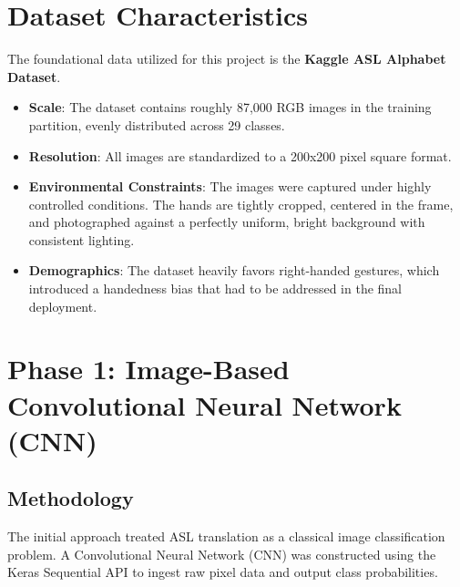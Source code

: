 \documentclass[12pt,a4paper]{article}
\begin{document}
\section{Dataset Characteristics}
The foundational data utilized for this project is the \textbf{Kaggle ASL Alphabet Dataset}. 
\begin{itemize}
    \item \textbf{Scale}: The dataset contains roughly 87,000 RGB images in the training partition, evenly distributed across 29 classes.
    \item \textbf{Resolution}: All images are standardized to a 200x200 pixel square format.
    \item \textbf{Environmental Constraints}: The images were captured under highly controlled conditions. The hands are tightly cropped, centered in the frame, and photographed against a perfectly uniform, bright background with consistent lighting.
    \item \textbf{Demographics}: The dataset heavily favors right-handed gestures, which introduced a handedness bias that had to be addressed in the final deployment.
\end{itemize}

\section{Phase 1: Image-Based Convolutional Neural Network (CNN)}

\subsection{Methodology}
The initial approach treated ASL translation as a classical image classification problem. A Convolutional Neural Network (CNN) was constructed using the Keras Sequential API to ingest raw pixel data and output class probabilities.
\end{document}
